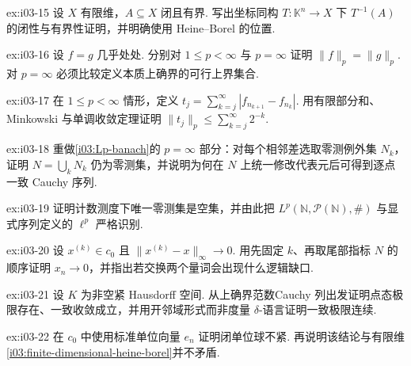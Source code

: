 \begin{FAExercise}[有限维闭有界集紧]{ex:i03-15}
设 \(\displaystyle X\) 有限维，\(\displaystyle A\subseteq X\) 闭且有界. 写出坐标同构 \(\displaystyle T:\mathbb K^n\to X\) 下 \(\displaystyle T^{-1}(A)\) 的闭性与有界性证明，并明确使用 Heine--Borel 的位置.
\end{FAExercise}

\begin{FAExercise}{ex:i03-16}
设 \(\displaystyle f=g\) 几乎处处. 分别对 \(\displaystyle 1\leqslant p<\infty\) 与 \(\displaystyle p=\infty\) 证明 \(\displaystyle \|f\|_p=\|g\|_p\). 对 \(\displaystyle p=\infty\) 必须比较定义本质上确界的可行上界集合.
\end{FAExercise}

\begin{FAExercise}{ex:i03-17}
在 \(\displaystyle 1\leqslant p<\infty\) 情形，定义 \(\displaystyle t_j=\sum_{k=j}^{\infty}|f_{n_{k+1}}-f_{n_k}|\). 用有限部分和、Minkowski 与单调收敛定理证明 \(\displaystyle \|t_j\|_p\leqslant\sum_{k=j}^{\infty}2^{-k}\).
\end{FAExercise}

\begin{FAExercise}{ex:i03-18}
重做\autoref{i03:Lp-banach}的 \(\displaystyle p=\infty\) 部分：对每个相邻差选取零测例外集 \(\displaystyle N_k\)，证明 \(\displaystyle N=\bigcup_kN_k\) 仍为零测集，并说明为何在 \(\displaystyle N\) 上统一修改代表元后可得到逐点一致 Cauchy 序列.
\end{FAExercise}

\begin{FAExercise}[计数测度与序列空间]{ex:i03-19}
证明计数测度下唯一零测集是空集，并由此把 \(\displaystyle L^p(\mathbb N,\mathcal P(\mathbb N),\#)\) 与显式序列定义的 \(\displaystyle \ell^p\) 严格识别.
\end{FAExercise}

\begin{FAExercise}{ex:i03-20}
设 \(\displaystyle x^{(k)}\in c_0\) 且 \(\displaystyle \|x^{(k)}-x\|_\infty\to0\). 用先固定 \(\displaystyle k\)、再取尾部指标 \(\displaystyle N\) 的顺序证明 \(\displaystyle x_n\to0\)，并指出若交换两个量词会出现什么逻辑缺口.
\end{FAExercise}

\begin{FAExercise}[连续函数空间的完备性]{ex:i03-21}
设 \(\displaystyle K\) 为非空紧 Hausdorff 空间. 从上确界范数Cauchy 列出发证明点态极限存在、一致收敛成立，并用开邻域形式而非度量 \(\displaystyle \delta\)-语言证明一致极限连续.
\end{FAExercise}

\begin{FAExercise}[无限维闭单位球非紧性的具体版本]{ex:i03-22}
在 \(\displaystyle c_0\) 中使用标准单位向量 \(\displaystyle e_n\) 证明闭单位球不紧. 再说明该结论与有限维\autoref{i03:finite-dimensional-heine-borel}并不矛盾.
\end{FAExercise}
